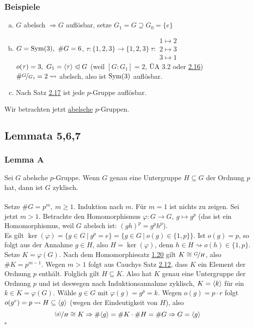 \subsubsection*{Beispiele}
\begin{enumerate}[(a)]
	\item $G$ abelsch $\Rightarrow G$ auflösbar, setze $G_1=G\supseteq G_0=\{e\}$
	\item $G=\operatorname{Sym}(3),~\#G=6$, $\tau:\{1,2,3\}\to \{1,2,3\}~\tau:\begin{array}{c} 1\mapsto 2\\ 2\mapsto 3\\ 3\mapsto 1 \end{array}$\\
	$o(\tau)=3,~G_1=\langle \tau \rangle\trianglelefteqslant G$ (weil $[G:G_1]=2$, ÜA 3.2 oder \hyperref[sub:satz_8]{2.16})\\
	$\#\nicefrac{G}{G_1}=2\rightsquigarrow$ abelsch, also ist $\operatorname{Sym}(3)$ auflösbar.
	\item Nach Satz \hyperref[sub:lemma_4]{2.17} ist jede $p$-Gruppe auflösbar.
\end{enumerate}

Wir betrachten jetzt \uline{abelsche} $p$-Gruppen.

\subsection{Lemmata 5,6,7}
\label{sub:lemmata}
\subsubsection*{Lemma A}
Sei $G$ abelsche $p$-Gruppe. Wenn $G$ genau eine Untergruppe $H\subseteq G$ der Ordnung $p$ hat, dann ist $G$ zyklisch.\\

\\
Setze $\#G=p^m,~m\ge 1$. Induktion nach $m$. 
Für $m=1$ ist nichts zu zeigen. Sei jetzt $m>1$. 
Betrachte den Homomorphismus $\varphi: G\to G,~g\mapsto g^p$ (das ist ein Homomorphismus, weil $G$ abelsch ist: $(gh)^p=g^ph^p$).\\
Es gilt $\ker(\varphi)=\big\{g\in G~|~g^p=e \big\}=\big\{g\in G~|~o(g)\in \{1,p\} \big\}$. 
Ist $o(g)=p$, so folgt aus der Annahme $g\in H$, also $H=\ker(\varphi)$, denn $h\in H\rightsquigarrow o(h)\in \{1,p\}$.\\
Setze $K=\varphi(G)$. Nach dem Homomorphiesatz \hyperref[sub:der_homomorphiesatz]{1.20} gilt $K\cong \nicefrac{G}{H}$, also $\#K=p^{m-1}$. 
Wegen $m>1$ folgt aus Cauchys Satz \hyperref[sub:cauchys_satz]{2.12}, dass $K$ ein Element der Ordnung $p$ enthält. 
Folglich gilt $H\subseteq K$. 
Also hat $K$ genau eine Untergruppe der Ordnung $p$ und ist deswegen nach Induktionsannahme zyklisch, $K=\langle k \rangle$ für ein $k\in K=\varphi(G)$. Wähle $g\in G$ mit $\varphi(g)=g^p=k$. 
Wegen $o(g)=p\cdot r$ folgt $o(g^r)=p\rightsquigarrow H\subseteq \langle g \rangle$ (wegen der Eindeutigkeit von $H$), also 
\[
\nicefrac{\langle g \rangle}{H}\cong K\Rightarrow\#\langle g \rangle=\#K\cdot\#H=\#G\Rightarrow G=\langle g \rangle
\]
\hfill $\square$

